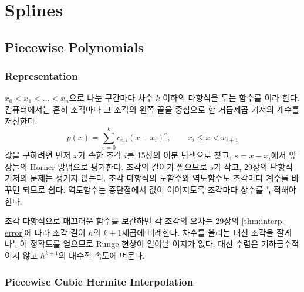 \chapter{Splines}
\label{ch:splines}


\section{Piecewise Polynomials}
\label{sec:ppoly}

\subsection{Representation}

 $x_0<x_1<\dots<x_n$으로 나눈 구간마다 차수 $k$ 이하의 다항식을 두는 함수를 이라 한다. 컴퓨터에서는 흔히 조각마다 그 조각의 왼쪽 끝을 중심으로 한 거듭제곱 기저의 계수를 저장한다.
\[
p(x)=\sum_{e=0}^kc_{e,i}(x-x_i)^e,\qquad x_i\le x<x_{i+1}
\]
값을 구하려면 먼저 $x$가 속한 조각 $i$를 15장의 이분 탐색으로 찾고, $s=x-x_i$에서 앞 장들의 Horner 방법으로 평가한다. 조각의 길이가 짧으므로 $s$가 작고, 29장의 단항식 기저의 문제는 생기지 않는다. 조각 다항식의 도함수와 역도함수도 조각마다 계수를 바꾸면 되므로 쉽다. 역도함수는 중단점에서 값이 이어지도록 조각마다 상수를 누적해야 한다.

조각 다항식으로 매끄러운 함수를 보간하면 각 조각의 오차는 29장의 \cref{thm:interp-error}에 따라 조각 길이 $h$의 $k+1$제곱에 비례한다. 차수를 올리는 대신 조각을 잘게 나누어 정확도를 얻으므로 Runge 현상이 일어날 여지가 없다. 대신 수렴은 기하급수적이지 않고 $h^{k+1}$의 대수적 속도에 머문다.

\subsection{Piecewise Cubic Hermite Interpolation}

